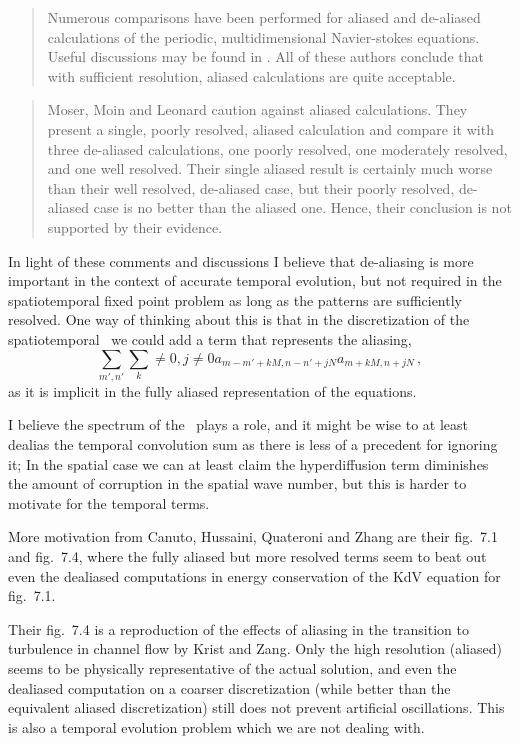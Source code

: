 \begin{description}
{\begin{quote}
Numerous comparisons have been performed for aliased and de-aliased
calculations of the periodic, multidimensional Navier-stokes equations.
Useful discussions may be found in
.  All of these authors conclude
that with sufficient resolution, aliased calculations are quite acceptable.
\end{quote}


\begin{quote}
Moser, Moin and Leonard caution against aliased calculations.
They present a single, poorly resolved, aliased calculation and compare it with three
de-aliased calculations, one poorly resolved, one moderately resolved, and one well
resolved. Their single aliased result is certainly much worse than their well resolved,
de-aliased case, but their poorly resolved, de-aliased case is no better than the aliased
one. Hence, their conclusion is not supported by their evidence.
\end{quote}

In light of these comments and discussions I believe that de-aliasing is more
important in the context of accurate temporal evolution, but not required in
the spatiotemporal fixed point problem as long as the patterns are
sufficiently resolved. One way of thinking about this is that in the
discretization of the spatiotemporal \KSe\ we could add a term that
represents the aliasing,
\[
\sum_{m',n'}\sum_k\neq 0,j\neq 0 a_{m-m'+kM,n-n'+jN}a_{m+kM,n+jN}
\,,
\]
as it is implicit in the fully aliased representation of the equations.

I believe the spectrum of the \KSe\ plays a role, and it might be wise to at
least dealias the temporal convolution sum as there is less of a precedent
for ignoring it; In the spatial case we can at least claim the hyperdiffusion
term diminishes the amount of corruption in the spatial wave number, but this
is harder to motivate for the temporal terms.

More motivation from Canuto, Hussaini, Quateroni and Zhang are
their fig.~7.1 and fig.~7.4, where the fully aliased but more resolved terms seem
to beat out even the dealiased computations in energy conservation of the KdV
equation for fig.~7.1.

Their fig.~7.4 is a reproduction of the effects of aliasing in the transition
to turbulence in channel flow by  Krist and Zang. Only the high
resolution (aliased) seems to be physically representative of the actual
solution, and even the dealiased computation on a coarser discretization
(while better than the equivalent aliased discretization) still does not
prevent artificial oscillations. This is also a temporal evolution problem
which we are not dealing with.

}
\end{description}
